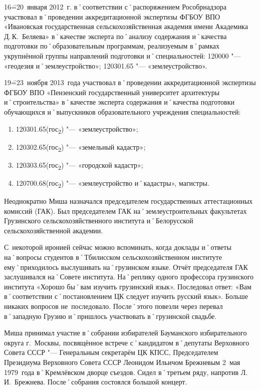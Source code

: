 16\==20~января 2012~г. в˚соответствии с˚распоряжением Рособрнадзора участвовал в˚проведении аккредитационной экспертизы ФГБОУ ВПО «Ивановская государственная сельскохозяйственная академия имени Академика Д.\,К.~Беляева» в˚качестве эксперта по˚анализу содержания и˚качества подготовки по˚образовательным программам, реализуемым в˚рамках укрупнённой группы направлений подготовки и˚специальностей: 120000 "--- «геодезия и˚землеустройство»; 120301.65 "--- «землеустройство».

19\==23~ноября 2013~года участвовал в˚проведении аккредитационной экспертизы ФГБОУ ВПО «Пензенский государственный университет архитектуры и˚строительства» в˚качестве эксперта содержания и˚качества подготовки обучающихся и˚выпускников образовательного учреждения специальностей:

\begin{enumerate}
	\item 120301.65(гос\textsubscript{2}) "--- «землеустройство»; 
	\item 120302.65(гос\textsubscript{2}) "--- «земельный кадастр»; 
	\item 120303.65(гос\textsubscript{2}) "--- «городской кадастр»; 
 	\item 120700.68(гос\textsubscript{2}) "--- «землеустройство и˚кадастры», магистры.
\end{enumerate}

Неоднократно Миша назначался председателем государственных аттестационных комиссий (ГАК). Был председателем ГАК на˚землеустроительных факультетах Грузинского сельскохозяйственного института и˚Белорусской сельскохозяйственной академии. 

С~некоторой иронией сейчас можно вспоминать, когда доклады и˚ответы на˚вопросы студентов в˚Тбилисском сельскохозяйственном институте ему˚приходилось выслушивать на˚грузинском языке. Отчёт председателя ГАК заслушивался на˚Совете института. На˚реплику одного профессора грузинского института «Хорошо бы˚вам изучить грузинский язык». Последовал ответ: «Вам в˚соответствии с˚постановлением ЦК следует изучить русский язык». Больше никаких вопросов не~последовало. После˚этого повезли через перевал в˚западную Грузию и˚пришлось участвовать в˚грузинской свадьбе.

Миша принимал участие в˚собрании избирателей Бауманского избирательного округа г.~Москвы, посвящённое встрече с˚кандидатом в˚депутаты Верховного Совета СССР "--- Генеральным секретарём ЦК КПСС, Председателем Президиума Верховного Совета СССР Леонидом Ильичом Брежневым 2~мая 1979~года в˚Кремлёвском дворце съездов. Сидел в˚третьем ряду, напротив Л.\,И.~Брежнева. После˚собрания состоялся большой концерт. 

